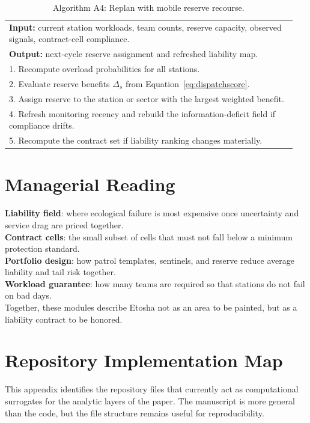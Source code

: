 \begin{table}[H]
\centering
\caption{Algorithm A4: Replan with mobile reserve recourse.}
\label{alg:app_reserve}
\begin{tabular}{p{0.95\linewidth}}
\toprule
\textbf{Input:} current station workloads, team counts, reserve capacity, observed signals, contract-cell compliance. \\
\textbf{Output:} next-cycle reserve assignment and refreshed liability map. \\
\midrule
1. Recompute overload probabilities for all stations. \\
2. Evaluate reserve benefits \(\Delta_s\) from Equation~\eqref{eq:dispatchscore}. \\
3. Assign reserve to the station or sector with the largest weighted benefit. \\
4. Refresh monitoring recency and rebuild the information-deficit field if compliance drifts. \\
5. Recompute the contract set if liability ranking changes materially. \\
\bottomrule
\end{tabular}
\end{table}

\section{Managerial Reading}
\textbf{Liability field}: where ecological failure is most expensive once uncertainty and service drag are priced together.\\
\textbf{Contract cells}: the small subset of cells that must not fall below a minimum protection standard.\\
\textbf{Portfolio design}: how patrol templates, sentinels, and reserve reduce average liability and tail risk together.\\
\textbf{Workload guarantee}: how many teams are required so that stations do not fail on bad days.\\

Together, these modules describe Etosha not as an area to be painted, but as a liability contract to be honored.

\section{Repository Implementation Map}
This appendix identifies the repository files that currently act as computational surrogates for the analytic layers of the paper. The manuscript is more general than the code, but the file structure remains useful for reproducibility.

